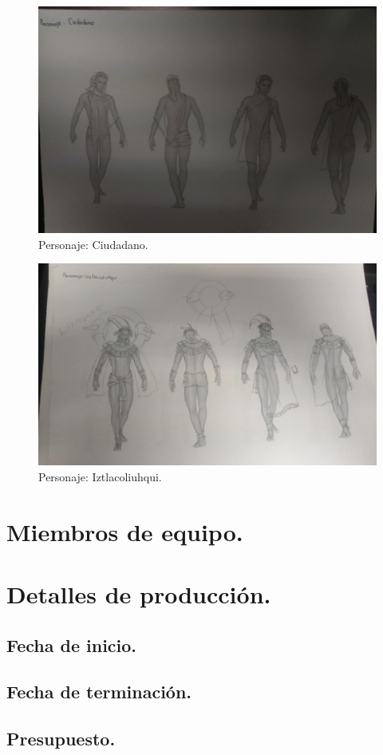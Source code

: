 \documentclass[11pt,letterpaper]{article}
\begin{document}
	\begin{figure}
	\centering
	\includegraphics[height=0.4 \linewidth]{Imagenes/ic05}
	\caption{Personaje: Ciudadano.}
	\label{fig:ciudadano01}
\end{figure}
	\begin{figure}
	\centering
	\includegraphics[height=0.4 \linewidth]{Imagenes/ic06}
	\caption{Personaje: Iztlacoliuhqui.}
	\label{fig:perIztla}
\end{figure}

\section{Miembros de equipo.}

\section{Detalles de producción.}
\subsection{Fecha de inicio.}
\subsection{Fecha de terminación.}
\subsection{Presupuesto.}

\printglossary
\end{document}
